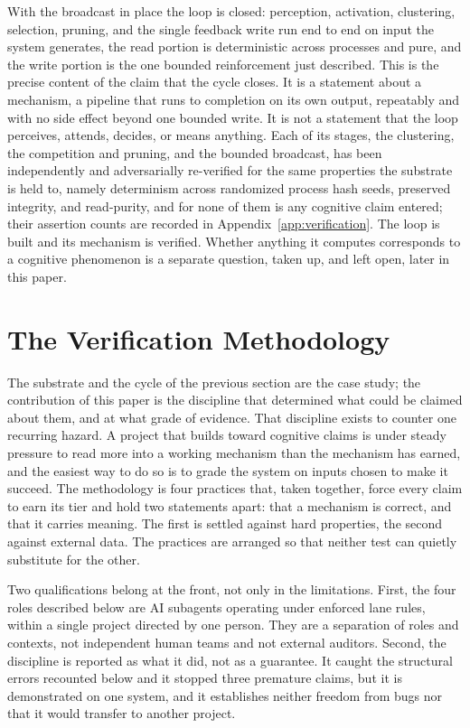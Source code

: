 \documentclass[11pt]{article}
\begin{document}
With the broadcast in place the loop is closed: perception, activation, clustering,
selection, pruning, and the single feedback write run end to end on input the system
generates, the read portion is deterministic across processes and pure, and the write
portion is the one bounded reinforcement just described. This is the precise content of
the claim that the cycle closes. It is a statement about a mechanism, a pipeline that
runs to completion on its own output, repeatably and with no side effect beyond one
bounded write. It is not a statement that the loop perceives, attends, decides, or
means anything. Each of its stages, the clustering, the competition and pruning, and
the bounded broadcast, has been independently and adversarially re-verified for the
same properties the substrate is held to, namely determinism across randomized process
hash seeds, preserved integrity, and read-purity, and for none of them is any cognitive
claim entered; their assertion counts are recorded in Appendix~\ref{app:verification}.
The loop is built and its mechanism is verified. Whether anything it computes
corresponds to a cognitive phenomenon is a separate question, taken up, and left open,
later in this paper.

\section{The Verification Methodology}\label{sec:methodology}

The substrate and the cycle of the previous section are the case study; the
contribution of this paper is the discipline that determined what could be claimed
about them, and at what grade of evidence. That discipline exists to counter one
recurring hazard. A project that builds toward cognitive claims is under steady
pressure to read more into a working mechanism than the mechanism has earned, and the
easiest way to do so is to grade the system on inputs chosen to make it succeed. The
methodology is four practices that, taken together, force every claim to earn its tier
and hold two statements apart: that a mechanism is correct, and that it carries
meaning. The first is settled against hard properties, the second against external
data. The practices are arranged so that neither test can quietly substitute for the
other.

Two qualifications belong at the front, not only in the limitations. First, the four
roles described below are AI subagents operating under enforced lane rules, within a
single project directed by one person. They are a separation of roles and contexts, not
independent human teams and not external auditors. Second, the discipline is reported
as what it did, not as a guarantee. It caught the structural errors recounted below and
it stopped three premature claims, but it is demonstrated on one system, and it
establishes neither freedom from bugs nor that it would transfer to another project.
\end{document}

